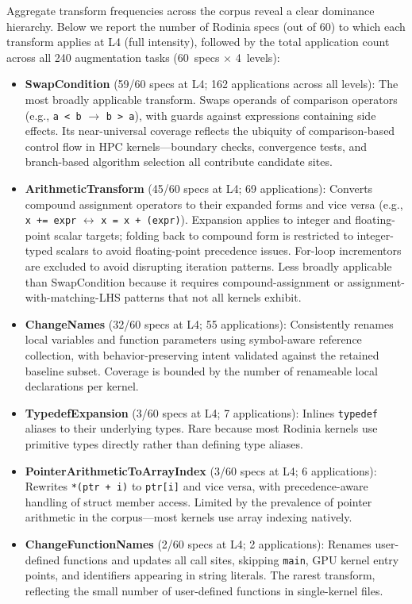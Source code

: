 Aggregate transform frequencies across the corpus reveal a clear dominance hierarchy. Below we report the number of Rodinia specs (out of 60) to which each transform applies at L4 (full intensity), followed by the total application count across all 240 augmentation tasks (60~specs $\times$ 4~levels):
  
\begin{itemize}
  \item \textbf{SwapCondition} (59/60 specs at L4; 162 applications across all levels): The most broadly applicable transform. Swaps operands of comparison operators (e.g., \texttt{a < b} $\rightarrow$ \texttt{b > a}), with guards against expressions containing side effects. Its near-universal coverage reflects the ubiquity of comparison-based control flow in HPC kernels---boundary checks, convergence tests, and branch-based algorithm selection all contribute candidate sites.
  
  \item \textbf{ArithmeticTransform} (45/60 specs at L4; 69 applications): Converts compound assignment operators to their expanded forms and vice versa (e.g., \texttt{x += expr} $\leftrightarrow$ \texttt{x = x + (expr)}). Expansion applies to integer and floating-point scalar targets; folding back to compound form is restricted to integer-typed scalars to avoid floating-point precedence issues. For-loop incrementors are excluded to avoid disrupting iteration patterns. Less broadly applicable than SwapCondition because it requires compound-assignment or assignment-with-matching-LHS patterns that not all kernels exhibit.
  \item \textbf{ChangeNames} (32/60 specs at L4; 55 applications): Consistently renames local variables and function parameters using symbol-aware reference collection, with behavior-preserving intent validated against the retained baseline subset. Coverage is bounded by the number of renameable local declarations per kernel.
  
  \item \textbf{TypedefExpansion} (3/60 specs at L4; 7 applications): Inlines \texttt{typedef} aliases to their underlying types. Rare because most Rodinia kernels use primitive types directly rather than defining type aliases.
  
  \item \textbf{PointerArithmeticToArrayIndex} (3/60 specs at L4; 6 applications): Rewrites \texttt{*(ptr + i)} to \texttt{ptr[i]} and vice versa, with precedence-aware handling of struct member access. Limited by the prevalence of pointer arithmetic in the corpus---most kernels use array indexing natively.
  
  \item \textbf{ChangeFunctionNames} (2/60 specs at L4; 2 applications): Renames user-defined functions and updates all call sites, skipping \texttt{main}, GPU kernel entry points, and identifiers appearing in string literals. The rarest transform, reflecting the small number of user-defined functions in single-kernel files.
\end{itemize}


